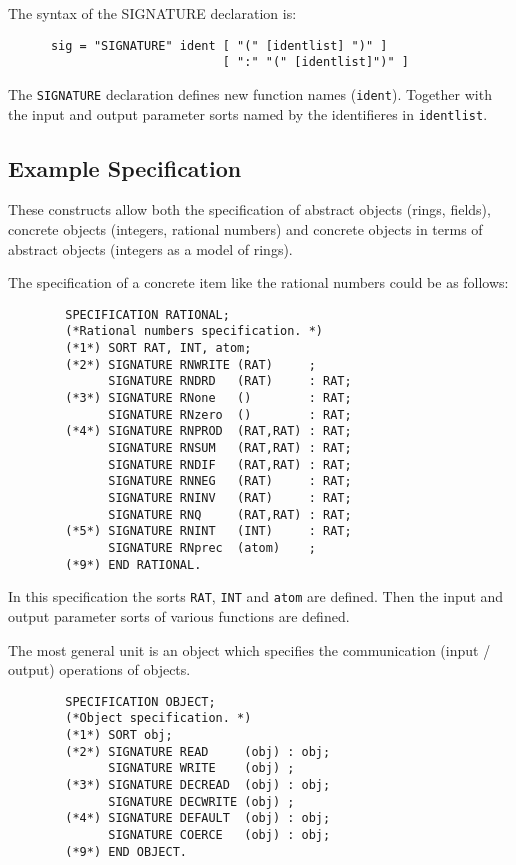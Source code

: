 The syntax of the SIGNATURE declaration is:
\begin{verbatim}
      sig = "SIGNATURE" ident [ "(" [identlist] ")" ] 
                              [ ":" "(" [identlist]")" ] 
\end{verbatim}
The \verb/SIGNATURE/ declaration defines 
new function names (\verb/ident/).
Together with the 
input and output parameter sorts named 
by the identifieres in \verb/identlist/. 

\subsection{Example Specification}

These constructs allow both the specification of 
abstract objects (rings, fields),
concrete objects (integers, rational numbers) and 
concrete objects in terms of abstract objects 
(integers as a model of rings). 

The specification of a concrete item like the 
rational numbers could be as follows: 
\begin{verbatim}
        SPECIFICATION RATIONAL;
        (*Rational numbers specification. *)
        (*1*) SORT RAT, INT, atom;
        (*2*) SIGNATURE RNWRITE (RAT)     ;
              SIGNATURE RNDRD   (RAT)     : RAT;
        (*3*) SIGNATURE RNone   ()        : RAT;
              SIGNATURE RNzero  ()        : RAT;
        (*4*) SIGNATURE RNPROD  (RAT,RAT) : RAT;
              SIGNATURE RNSUM   (RAT,RAT) : RAT;
              SIGNATURE RNDIF   (RAT,RAT) : RAT;
              SIGNATURE RNNEG   (RAT)     : RAT;
              SIGNATURE RNINV   (RAT)     : RAT;
              SIGNATURE RNQ     (RAT,RAT) : RAT;
        (*5*) SIGNATURE RNINT   (INT)     : RAT;
              SIGNATURE RNprec  (atom)    ;
        (*9*) END RATIONAL.
\end{verbatim}
In this specification the sorts \verb/RAT/, 
\verb/INT/ and \verb/atom/ are defined. 
Then the input and output parameter sorts of various 
functions are defined. 

The most general unit is an object which 
specifies the communication (input / output) 
operations of objects. 
\begin{verbatim}
        SPECIFICATION OBJECT;
        (*Object specification. *)
        (*1*) SORT obj;
        (*2*) SIGNATURE READ     (obj) : obj;
              SIGNATURE WRITE    (obj) ;
        (*3*) SIGNATURE DECREAD  (obj) : obj;
              SIGNATURE DECWRITE (obj) ;
        (*4*) SIGNATURE DEFAULT  (obj) : obj;
              SIGNATURE COERCE   (obj) : obj;
        (*9*) END OBJECT.
\end{verbatim}

